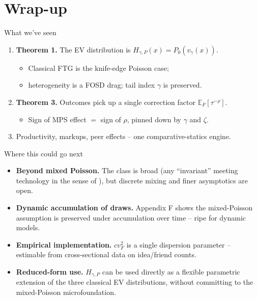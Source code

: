 \documentclass[aspectratio=169,xcolor=dvipsnames]{beamer}
\begin{document}
\section{Wrap-up}

\begin{frame}{What we've seen}
    \begin{enumerate}
        \item \textbf{Theorem 1.} The EV distribution is $H_{\gamma,P}(x) = P_0(v_\gamma(x))$.
        \begin{itemize}
            \item Classical FTG is the knife-edge Poisson case;
            \item heterogeneity is a FOSD drag; tail index $\gamma$ is preserved.
        \end{itemize}
        \vspace{2mm}
        \item \textbf{Theorem 3.} Outcomes pick up a single correction factor $\mathbb{E}_F[\tau^{-\rho}]$.
        \begin{itemize}
            \item Sign of MPS effect $=$ sign of $\rho$, pinned down by $\gamma$ and $\zeta$.
        \end{itemize}
        \vspace{2mm}
        \item Productivity, markups, peer effects -- one comparative-statics engine.
    \end{enumerate}
\end{frame}

\begin{frame}{Where this could go next}
    \begin{itemize}
        \item \textbf{Beyond mixed Poisson.} The class is broad (any ``invariant'' meeting technology in the sense of \citealp{lester2015}), but discrete mixing and finer asymptotics are open.
        \vspace{2mm}
        \item \textbf{Dynamic accumulation of draws.} Appendix F shows the mixed-Poisson assumption is preserved under accumulation over time -- ripe for dynamic models.
        \vspace{2mm}
        \item \textbf{Empirical implementation.} $cv^2_F$ is a single dispersion parameter -- estimable from cross-sectional data on idea/friend counts.
        \vspace{2mm}
        \item \textbf{Reduced-form use.} $H_{\gamma,P}$ can be used directly as a flexible parametric extension of the three classical EV distributions, without committing to the mixed-Poisson microfoundation.
    \end{itemize}
\end{frame}
\end{document}
